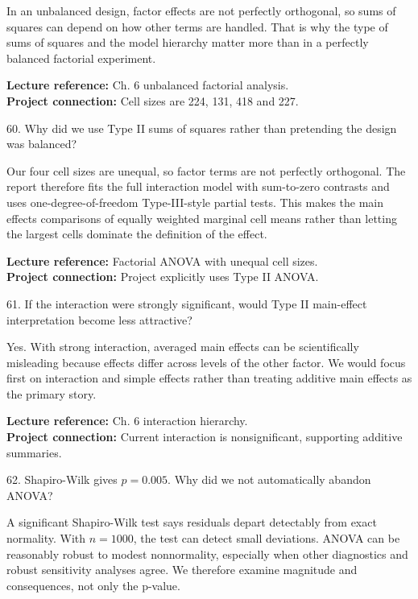 \documentclass[10.5pt,a4paper]{article}
\newcommand{\chapref}[1]{\textbf{Lecture reference:} #1}
\newcommand{\projectref}[1]{\textbf{Project connection:} #1}
\begin{document}
\begin{answerbox}In an unbalanced design, factor effects are not perfectly orthogonal, so sums of squares can depend on how other terms are handled. That is why the type of sums of squares and the model hierarchy matter more than in a perfectly balanced factorial experiment.\end{answerbox}
\begin{refbox}\chapref{Ch. 6 unbalanced factorial analysis.}\\\projectref{Cell sizes are 224, 131, 418 and 227.}\end{refbox}
\begin{qbox}{60. Why did we use Type II sums of squares rather than pretending the design was balanced?}
\end{qbox}
\begin{answerbox}Our four cell sizes are unequal, so factor terms are not perfectly orthogonal. The report therefore fits the full interaction model with sum-to-zero contrasts and uses one-degree-of-freedom Type-III-style partial tests. This makes the main effects comparisons of equally weighted marginal cell means rather than letting the largest cells dominate the definition of the effect.\end{answerbox}
\begin{refbox}\chapref{Factorial ANOVA with unequal cell sizes.}\\\projectref{Project explicitly uses Type II ANOVA.}\end{refbox}
\begin{qbox}{61. If the interaction were strongly significant, would Type II main-effect interpretation become less attractive?}
\end{qbox}
\begin{answerbox}Yes. With strong interaction, averaged main effects can be scientifically misleading because effects differ across levels of the other factor. We would focus first on interaction and simple effects rather than treating additive main effects as the primary story.\end{answerbox}
\begin{refbox}\chapref{Ch. 6 interaction hierarchy.}\\\projectref{Current interaction is nonsignificant, supporting additive summaries.}\end{refbox}
\begin{qbox}{62. Shapiro-Wilk gives $p=0.005$. Why did we not automatically abandon ANOVA?}
\end{qbox}
\begin{answerbox}A significant Shapiro-Wilk test says residuals depart detectably from exact normality. With \(n=1000\), the test can detect small deviations. ANOVA can be reasonably robust to modest nonnormality, especially when other diagnostics and robust sensitivity analyses agree. We therefore examine magnitude and consequences, not only the p-value.\end{answerbox}
\end{document}
